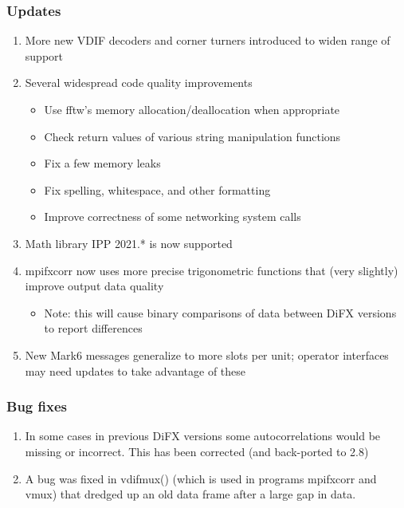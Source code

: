 \subsubsection{Updates}
\begin{enumerate}
\item More new VDIF decoders and corner turners introduced to widen range of support
\item Several widespread code quality improvements
\begin{itemize}
  \item Use fftw's memory allocation/deallocation when appropriate
  \item Check return values of various string manipulation functions
  \item Fix a few memory leaks
  \item Fix spelling, whitespace, and other formatting
  \item Improve correctness of some networking system calls
\end{itemize}
\item Math library IPP 2021.* is now supported
\item mpifxcorr now uses more precise trigonometric functions that (very slightly) improve output data quality
\begin{itemize}
  \item Note: this will cause binary comparisons of data between DiFX versions to report differences
\end{itemize}
\item New Mark6 messages generalize to more slots per unit; operator interfaces may need updates to take advantage of these 
\end{enumerate}

\subsubsection{Bug fixes}
\begin{enumerate}
\item In some cases in previous DiFX versions some autocorrelations would be missing or incorrect.  This has been corrected (and back-ported to 2.8)
\item A bug was fixed in vdifmux() (which is used in programs mpifxcorr and vmux) that dredged up an old data frame after a large gap in data.
\end{enumerate}

